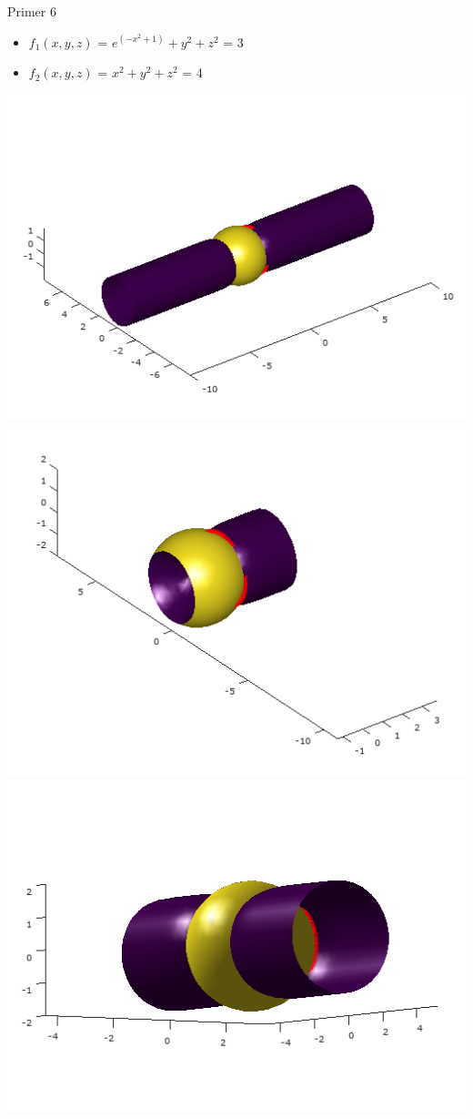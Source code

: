 \documentclass{beamer}
\begin{document}
	\begin{frame}{Primer 6}
		\begin{itemize}  
			\item $f_{1}(x,y,z)$ = $e^{(-x^{2}+1)}+y^{2}+z^{2}$ = 3
			\item $f_{2}(x,y,z)$ = $x^2 + y^2 + z^2$ = 4
		\end{itemize} 
		\includegraphics[scale=0.3]{primer6_1}
		\includegraphics[scale=0.3]{primer6_2}
		\includegraphics[scale=0.3]{primer6_3} 
	\end{frame}
\end{document}
